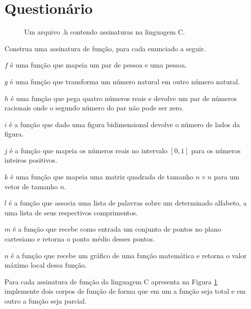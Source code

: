\section{Questionário}\label{sec:Questionario5part1}

\begin{figure}[h]
	
	\caption{Um arquivo .h contendo assinaturas na linguagem C.}
	\label{fig:ListaAssinaturas}
\end{figure}

\begin{questao}\label{prob:Funcao1}
	Construa uma assinatura de função, para cada enunciado a seguir.
\end{questao}

\begin{exerList}
	\item $f$ é uma função que mapeia um par de pessoa e uma  pessoa.
	\item $g$ é uma função que transforma um número natural em outro número natural.
	\item $h$ é uma função que pega quatro números reais e devolve um par de números racionais onde o segundo número do par não pode ser zero.
	\item $i$ é a função que dado uma figura bidimensional devolve o número de lados da figura.
	\item $j$ é a função que mapeia os números reais no intervalo $[0, 1]$ para os números inteiros positivos.
	\item $k$ é uma função que mapeia uma matriz quadrada de tamanho $n \times n$ para um vetor de tamanho $n$.
	\item $l$ é a função que associa uma lista de palavras sobre um determinado alfabeto, a uma lista de seus respectivos comprimentos.
	\item $m$ é a função que recebe como entrada um conjunto de pontos no plano cartesiano e retorna o ponto médio desses pontos.
	\item $n$ é a função que recebe um gráfico de uma função matemática e retorna o valor máximo local dessa função.
\end{exerList}

\begin{questao}\label{prob:Funcao2}
	Para cada assinatura de função da linguagem C apresenta na Figura \ref{fig:ListaAssinaturas} implemente dois corpos de função de forma que em um a função seja total e em outro a função seja parcial.
\end{questao}

